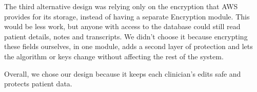 \documentclass[12pt, titlepage]{article}
\begin{document}
\begin{enumerate}
The third alternative design was relying only on the encryption that AWS provides for its storage, instead of having a separate Encryption module.
This would be less work, but anyone with access to the database could still read patient details, notes and transcripts.
We didn't choose it because encrypting these fields ourselves, in one module, adds a second layer of protection and lets the algorithm or keys change without affecting the rest of the system.

Overall, we chose our design because it keeps each clinician's edits safe and protects patient data.

\end{enumerate}
\end{document}
